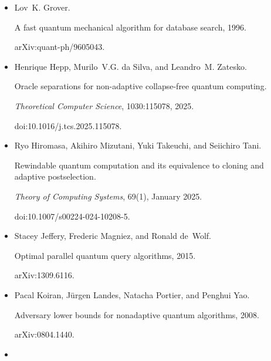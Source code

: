\documentclass[10pt,a4paper]{article}
\begin{document}
\begin{itemize}
doi:10.48550/arXiv.2311.16057.





\item[] 
[19]

Lov K. Grover.


A fast quantum mechanical algorithm for database search, 1996.


arXiv:quant-ph/9605043.





\item[] 
[20]

Henrique Hepp, Murilo V.G. da Silva, and Leandro M. Zatesko.


Oracle separations for non-adaptive collapse-free quantum computing.


\emph{Theoretical Computer Science}, 1030:115078, 2025.


doi:10.1016/j.tcs.2025.115078.





\item[] 
[21]

Ryo Hiromasa, Akihiro Mizutani, Yuki Takeuchi, and Seiichiro Tani.


Rewindable quantum computation and its equivalence to cloning and
adaptive postselection.


\emph{Theory of Computing Systems}, 69(1), January 2025.


doi:10.1007/s00224-024-10208-5.





\item[] 
[22]

Stacey Jeffery, Frederic Magniez, and Ronald de Wolf.


Optimal parallel quantum query algorithms, 2015.


arXiv:1309.6116.





\item[] 
[23]

Pacal Koiran, Jürgen Landes, Natacha Portier, and Penghui Yao.


Adversary lower bounds for nonadaptive quantum algorithms, 2008.


arXiv:0804.1440.





\item[] 
[24]


\end{itemize}
\end{document}
